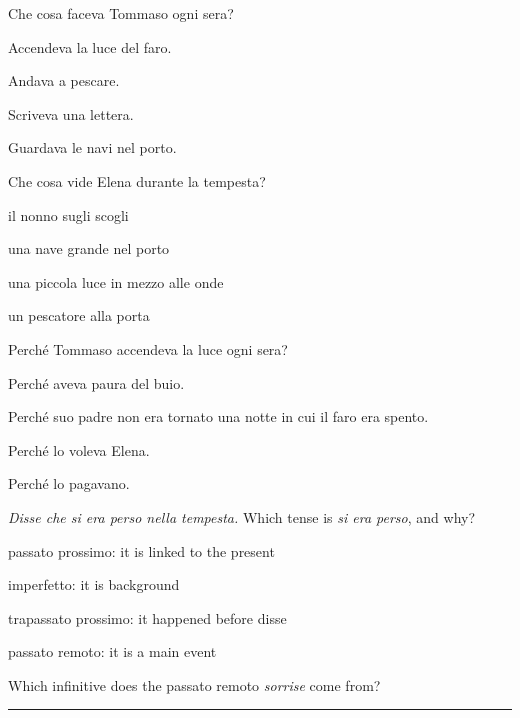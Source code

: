 \documentclass[11pt,a4paper,twoside,openright]{book}
\newcommand{\answerline}{\par\vspace{6pt}\noindent\rule{0.75\linewidth}{0.4pt}\par}
\begin{document}
\begin{exercises}
\item\label{ex:story-faro-1}\relax Che cosa faceva Tommaso ogni sera?\par\nopagebreak\begin{options}
\item\relax Accendeva la luce del faro.
\item\relax Andava a pescare.
\item\relax Scriveva una lettera.
\item\relax Guardava le navi nel porto.
\end{options}
\item\label{ex:story-faro-2}\relax Che cosa vide Elena durante la tempesta?\par\nopagebreak\begin{options}
\item\relax il nonno sugli scogli
\item\relax una nave grande nel porto
\item\relax una piccola luce in mezzo alle onde
\item\relax un pescatore alla porta
\end{options}
\item\label{ex:story-faro-3}\relax Perché Tommaso accendeva la luce ogni sera?\par\nopagebreak\begin{options}
\item\relax Perché aveva paura del buio.
\item\relax Perché suo padre non era tornato una notte in cui il faro era spento.
\item\relax Perché lo voleva Elena.
\item\relax Perché lo pagavano.
\end{options}
\item\label{ex:story-faro-4}\relax \textit{Disse che si era perso nella tempesta.} Which tense is \textit{si era perso}, and why?\par\nopagebreak\begin{options}
\item\relax passato prossimo: it is linked to the present
\item\relax imperfetto: it is background
\item\relax trapassato prossimo: it happened before disse
\item\relax passato remoto: it is a main event
\end{options}
\item\label{ex:story-faro-5}\relax Which infinitive does the passato remoto \textit{sorrise} come from?\par\answerline

\end{exercises}
\end{document}
